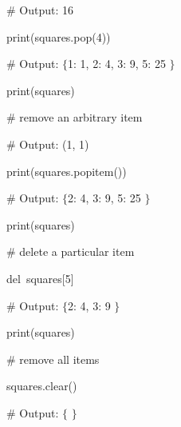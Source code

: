 \noindent 
 \hspace*{0.5in}  $  \#  $ Output: 16 \par
\noindent 
 \hspace*{0.5in} print(squares.pop(4))~  \par
\vspace{12pt}
\noindent 
 \hspace*{0.5in}  $  \#  $ Output:  $  \{  $1: 1, 2: 4, 3: 9, 5: 25 $  \}  $ \par
\noindent 
 \hspace*{0.5in} print(squares) \par
\vspace{12pt}
\noindent 
 \hspace*{0.5in}  $  \#  $ remove an arbitrary item \par
\noindent 
 \hspace*{0.5in}  $  \#  $ Output: (1, 1) \par
\noindent 
 \hspace*{0.5in} print(squares.popitem()) \par
\vspace{12pt}
\noindent 
 \hspace*{0.5in}  $  \#  $ Output:  $  \{  $2: 4, 3: 9, 5: 25 $  \}  $ \par
\noindent 
 \hspace*{0.5in} print(squares) \par
\vspace{12pt}
\noindent 
 \hspace*{0.5in}  $  \#  $ delete a particular item \par
\noindent 
 \hspace*{0.5in} del~squares[5]   \par
\vspace{12pt}
\noindent 
 \hspace*{0.5in}  $  \#  $ Output:  $  \{  $2: 4, 3: 9 $  \}  $ \par
\noindent 
 \hspace*{0.5in} print(squares) \par
\vspace{12pt}
\noindent 
 \hspace*{0.5in}  $  \#  $ remove all items \par
\noindent 
 \hspace*{0.5in} squares.clear() \par
\vspace{12pt}
\noindent 
 \hspace*{0.5in}  $  \#  $ Output:  $  \{  $ $  \}  $ \par
